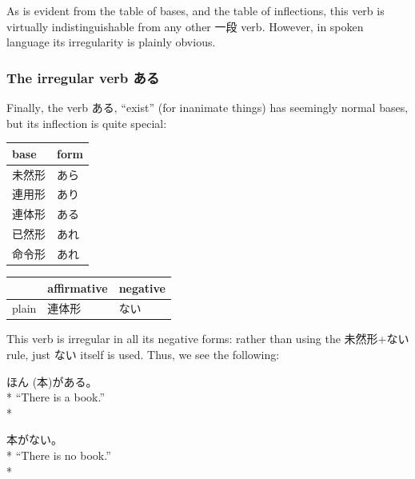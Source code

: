\documentclass[11pt, b5paper, twoside, openright, onecolumn]{book}
\makeatletter
\newcommand*{\rubystack}[2]{{\relscale{0.5}%
  \begin{tabular}[b]{@{}c@{}}%
    {#1}\\%
   {\textscale{2}{#2}}%
  \end{tabular}}%
}
\DeclareRobustCommand*{\ruby}[2]{%
  \mbox{%
    \setlength{\parskip}{0ex}%
    \BeginAccSupp{method=pdfstringdef,ActualText={#1}}%
      \rubystack{\phantom{#2}}{#1}%
      \llap{%
        \rubystack{#2}{\phantom{#1}}%
      }%
    \EndAccSupp{}%
  }%
}
\renewcommand*{\ruby}[2]{#2 (#1)}%
\newenvironment{exampleblock}{
\setlength{\parindent}{0.6in}
\begin{minipage}[t]{\dimexpr\textwidth-\parindent}}
{\end{minipage}}
\newenvironment{mytabular}[1]{\noindent\hspace{0.4in}
\begin{tabular}[h]{#1}}{\end{tabular}}
\makeatother
\begin{document}
As is evident from the table of bases‚ and the table of inflections‚ this verb is virtually indistinguishable from any other 一段 verb. However‚ in spoken language its irregularity is plainly obvious.

\subsubsection{The irregular verb ある}

Finally‚ the verb ある‚ “exist” (for inanimate things) has seemingly normal bases‚ but its inflection is quite special:

\vspace{0.5cm}
\smaller
\begin{mytabular}{| l  l |}\hline 
\rule{0pt}{2.4ex}base & form\\ 
\hline
\rule{0pt}{2.4ex}未然形 & あら\\ 
\rule{0pt}{2.4ex}連用形 & あり\\ 
\rule{0pt}{2.4ex}連体形 & ある\\ 
\rule{0pt}{2.4ex}已然形 & あれ\\ 
\rule{0pt}{2.4ex}命令形 & あれ\\ 
\hline 
\end{mytabular}
\larger
\vspace{0.5cm}

\smaller
\begin{mytabular}{| l  l  l |}\hline 
\rule{0pt}{2.4ex} & affirmative & negative\\ 
\hline
\rule{0pt}{2.4ex}plain & 連体形 & \index[japanese]{ない}ない\\ 
\hline 
\end{mytabular}
\larger
\vspace{0.5cm}


This verb is irregular in all its negative forms: rather than using the 未然形+ない rule‚ just ない itself is used. Thus‚ we see the following:

\vspace{0.4cm}
\begin{exampleblock}
\ruby{本}{ほん}がある。 \\* 
“There is a book.” \\* 
\end{exampleblock}
\vspace{0.2cm}

\begin{exampleblock}
本がない。 \\* 
“There is no book.” \\* 
\end{exampleblock}
\end{document}
